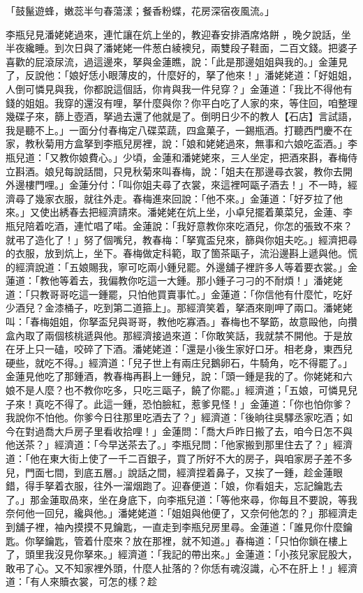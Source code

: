 「鼓鬣遊蜂，嫩蕊半勻春蕩漾；餐香粉蝶，花房深宿夜風流。」

李瓶兒見潘姥姥過來，連忙讓在炕上坐的，教迎春安排酒席烙餅 ，晚夕說話，坐半夜纔睡。到次日與了潘姥姥一件葱白綾襖兒，兩雙段子鞋面，二百文錢。把婆子喜歡的屁滾尿流，過這邊來，拏與金蓮瞧，說：「此是那邊姐姐與我的。」金蓮見了，反說他：「娘好恁小眼薄皮的，什麼好的，拏了他來！」潘姥姥道：「好姐姐，人倒可憐見與我，你都說這個話，你肯與我一件兒穿？」金蓮道：「我比不得他有錢的姐姐。我穿的還沒有哩，拏什麼與你？你平白吃了人家的來，等住回，咱整理幾碟子來，篩上壺酒，拏過去還了他就是了。倒明日少不的教人【石店】言試語，我是聽不上。」一面分付春梅定八碟菜蔬，四盒菓子，一錫瓶酒。打聽西門慶不在家，教秋菊用方盒拏到李瓶兒房裡，說：「娘和姥姥過來，無事和六娘吃盃酒。」李瓶兒道：「又教你娘費心。」少頃，金蓮和潘姥姥來，三人坐定，把酒來斟，春梅侍立斟酒。娘兒每說話間，只見秋菊來叫春梅，說：「姐夫在那邊尋衣裳，教你去開外邊樓門哩。」金蓮分付：「叫你姐夫尋了衣裳，來這裡呵甌子酒去！」不一時，經濟尋了幾家衣服，就往外走。春梅進來回說：「他不來。」金蓮道：「好歹拉了他來。」又使出綉春去把經濟請來。潘姥姥在炕上坐，小卓兒擺着菓菜兒，金蓮、李瓶兒陪着吃酒，連忙唱了喏。金蓮說：「我好意教你來吃酒兒，你怎的張致不來？就弔了造化了！」努了個嘴兒，教春梅：「拏寬盃兒來，篩與你姐夫吃。」經濟把尋的衣服，放到炕上，坐下。春梅做定科範，取了箇茶甌子，流沿邊斟上遞與他。慌的經濟說道：「五娘賜我，寧可吃兩小鍾兒罷。外邊舖子裡許多人等着要衣裳。」金蓮道：「教他等着去，我偏教你吃這一大鍾。那小鍾子刁刁的不耐煩！」潘姥姥道：「只教哥哥吃這一鍾罷，只怕他買賣事忙。」金蓮道：「你信他有什麼忙，吃好少酒兒？金漆桶子，吃到第二道箍上」。那經濟笑着，拏酒來剛呷了兩口。潘姥姥叫：「春梅姐姐，你拏盃兒與哥哥，教他吃寡酒。」春梅也不拏筯，故意毆他，向攢盒內取了兩個核桃遞與他。那經濟接過來道：「你敢笑話，我就禁不開他。于是放在牙上只一磕，咬碎了下酒。潘姥姥道：「還是小後生家好口牙。相老身，東西兒硬些，就吃不得。」經濟道：「兒子世上有兩庄兒鵝卵石，牛騎角，吃不得罷了。」金蓮見他吃了那鍾酒，教春梅再斟上一鍾兒，說：「頭一鍾是我的了。你姥姥和六娘不是人麼？也不教你吃多，只吃三甌子，饒了你罷。」經濟道；「五娘，可憐見兒子來！真吃不得了。此這一鍾，恐怕臉紅，惹爹見怪！」金蓮道：「你也怕你爹？我說你不怕他。你爹今日往那里吃酒去了？」經濟道：「後晌往吳驛丞家吃酒；如今在對過喬大戶房子里看收拾哩！」金蓮問：「喬大戶昨日搬了去，咱今日怎不與他送茶？」經濟道：「今早送茶去了。」李瓶兒問：「他家搬到那里住去了？」經濟道：「他在東大街上使了一千二百銀子，買了所好不大的房子，與咱家房子差不多兒，門面七間，到底五層。」說話之間，經濟捏着鼻子，又挨了一鍾，趁金蓮眼錯，得手拏着衣服，往外一溜烟跑了。迎春便道：「娘，你看姐夫，忘記鑰匙去了。」那金蓮取咼來，坐在身底下，向李瓶兒道：「等他來尋，你每且不要說，等我奈何他一回兒，纔與他。」潘姥姥道：「姐姐與他便了，又奈何他怎的？」那經濟走到舖子裡，袖內摸摸不見鑰匙，一直走到李瓶兒房里尋。金蓮道：「誰見你什麼鑰匙。你拏鑰匙，管着什麼來？放在那裡，就不知道。」春梅道：「只怕你鎖在樓上了，頭里我沒見你拏來。」經濟道：「我記的帶出來。」金蓮道：「小孩兒家屁股大，敢弔了心。又不知家裡外頭，什麼人扯落的？你恁有魂沒識，心不在肝上！」經濟道：「有人來贖衣裳，可怎的樣？趁